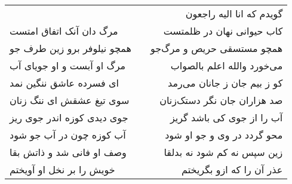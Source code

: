 \begin{center}
\begin{longtable}{l p{0.5cm} r}
&&
گویدم که انا الیه راجعون
\\
مرگ دان آنک اتفاق امتست
&&
کاب حیوانی نهان در ظلمتست
\\
همچو نیلوفر برو زین طرف جو
&&
همچو مستسقی حریص و مرگ‌جو
\\
مرگ او آبست و او جویای آب
&&
می‌خورد والله اعلم بالصواب
\\
ای فسرده عاشق ننگین نمد
&&
کو ز بیم جان ز جانان می‌رمد
\\
سوی تیغ عشقش ای ننگ زنان
&&
صد هزاران جان نگر دستک‌زنان
\\
جوی دیدی کوزه اندر جوی ریز
&&
آب را از جوی کی باشد گریز
\\
آب کوزه چون در آب جو شود
&&
محو گردد در وی و جو او شود
\\
وصف او فانی شد و ذاتش بقا
&&
زین سپس نه کم شود نه بدلقا
\\
خویش را بر نخل او آویختم
&&
عذر آن را که ازو بگریختم
\\
\end{longtable}
\end{center}
